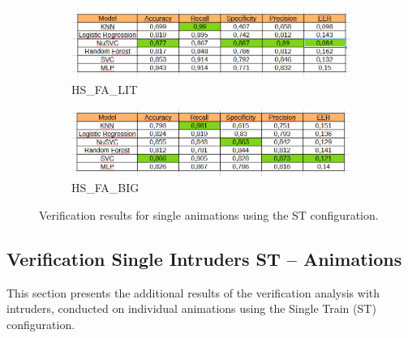\documentclass{article}
\begin{document}
\begin{figure}[H]
    \begin{subfigure}[b]{0.65\textwidth}
        \includegraphics[width=\linewidth]{Images/Results/Verification_single/st/HS_FA_LIT.png}
        \caption{HS\_FA\_LIT}
    \end{subfigure}
    \begin{subfigure}[b]{0.65\textwidth}
        \includegraphics[width=\linewidth]{Images/Results/Verification_single/st/HS_FA_BIG.png}
        \caption{HS\_FA\_BIG}
    \end{subfigure}
    \caption{Verification results for single animations using the ST configuration.}
\end{figure}
\FloatBarrier

\subsection{Verification Single Intruders ST – Animations}
\label{subsec:vs_sti_a}

This section presents the additional results of the verification analysis with intruders, conducted on individual animations using the Single Train (ST) configuration.
\end{document}
